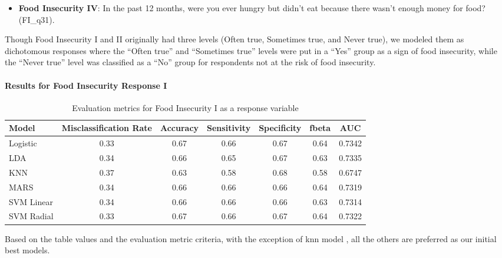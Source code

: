 \documentclass[
  10pt,
]{article}
\providecommand{\tightlist}{%
  \setlength{\itemsep}{0pt}\setlength{\parskip}{0pt}}
\begin{document}
\begin{itemize}
\tightlist
\item
  \textbf{Food Insecurity IV}: In the past 12 months, were you ever hungry but didn't eat because there wasn't enough money for food? (FI\_q31).
\end{itemize}

Though Food Insecurity I and II originally had three levels (Often true, Sometimes true, and Never true), we modeled them as dichotomous responses where the ``Often true'' and ``Sometimes true'' levels were put in a ``Yes'' group as a sign of food insecurity, while the ``Never true'' level was classified as a ``No'' group for respondents not at the risk of food insecurity.

\hypertarget{results-for-food-insecurity-response-i}{%
\paragraph{Results for Food Insecurity Response I}\label{results-for-food-insecurity-response-i}}

\begin{table}[H]

\caption{\label{tab:unnamed-chunk-17}Evaluation metrics for Food Insecurity I  as a response variable}
\centering
\fontsize{12}{14}\selectfont
\begin{tabular}[t]{lcccccc}
\toprule
Model & Misclassification Rate & Accuracy & Sensitivity & Specificity & fbeta & AUC\\
\midrule
Logistic & 0.33 & 0.67 & 0.66 & 0.67 & 0.64 & 0.7342\\
LDA & 0.34 & 0.66 & 0.65 & 0.67 & 0.63 & 0.7335\\
KNN & 0.37 & 0.63 & 0.58 & 0.68 & 0.58 & 0.6747\\
MARS & 0.34 & 0.66 & 0.66 & 0.66 & 0.64 & 0.7319\\
SVM Linear & 0.34 & 0.66 & 0.66 & 0.66 & 0.63 & 0.7314\\
SVM Radial & 0.33 & 0.67 & 0.66 & 0.67 & 0.64 & 0.7322\\
\bottomrule
\end{tabular}
\end{table}

Based on the table values and the evaluation metric criteria, with the exception of knn model , all the others are preferred as our initial best models.\\
\end{document}
